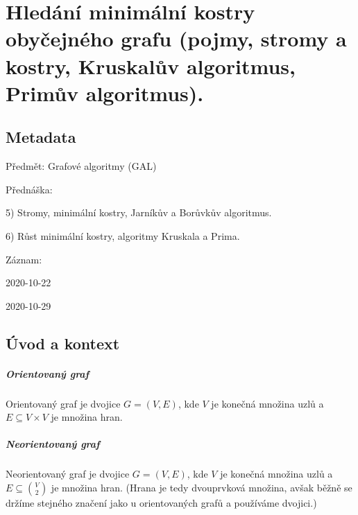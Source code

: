 

\chapter{Hledání minimální kostry obyčejného grafu (pojmy, stromy a kostry, Kruskalův algoritmus, Primův algoritmus).}


\section{Metadata}

\begin{compactitem}
    \item Předmět: Grafové algoritmy (GAL)
    \item Přednáška:
    \begin{compactitem}
        \item 5) Stromy, minimální kostry, Jarníkův a Borůvkův algoritmus.
        \item 6) Růst minimální kostry, algoritmy Kruskala a Prima.
    \end{compactitem}
    \item Záznam:
    \begin{compactitem}
        \item 2020-10-22
        \item 2020-10-29
    \end{compactitem}
\end{compactitem}


\section{Úvod a kontext}

\paragraph*{Orientovaný graf} Orientovaný graf je dvojice $G = (V, E)$, kde $V$ je konečná množina uzlů a $E \subseteq V \times V$ je množina hran.

\paragraph*{Neorientovaný graf} Neorientovaný graf je dvojice $G = (V, E)$, kde $V$ je konečná množina uzlů a $E \subseteq \binom{V}{2}$ je množina hran. (Hrana je tedy dvouprvková množina, avšak běžně se držíme stejného značení jako u orientovaných grafů a používáme dvojici.)

